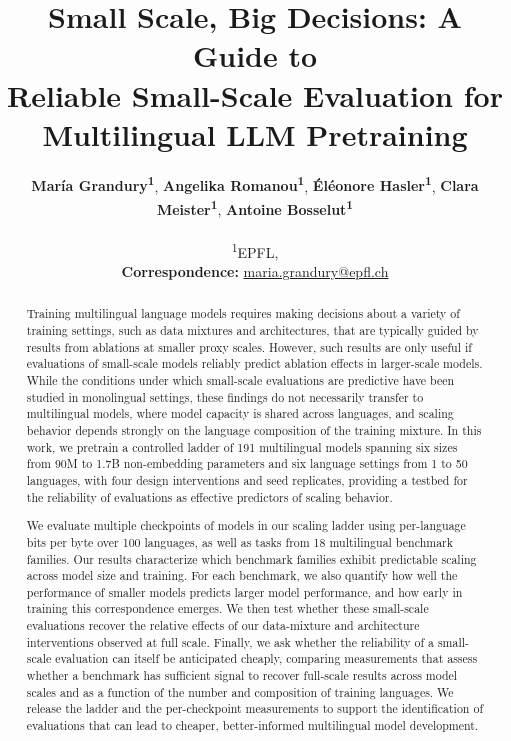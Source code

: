 \documentclass[11pt]{article}
\title{Small Scale, Big Decisions: A Guide to \\ Reliable Small-Scale Evaluation for Multilingual LLM Pretraining}
\author{
  \textbf{María Grandury\textsuperscript{1}},
  \textbf{Angelika Romanou\textsuperscript{1}},
  \textbf{Éléonore Hasler\textsuperscript{1}},
  \textbf{Clara Meister\textsuperscript{1}},
  \textbf{Antoine Bosselut\textsuperscript{1}}
\\
\\
  \textsuperscript{1}EPFL,
\\
  \small{
    \textbf{Correspondence:} \href{mailto:email@domain}{maria.grandury@epfl.ch}
  }
}
\newcommand{\nbenchmarks}{18 }
\newcommand{\nmodels}{191 }
\begin{document}
\maketitle
\begin{abstract}
Training multilingual language models requires making decisions about a variety of training settings, such as data mixtures and architectures, that are typically guided by results from ablations at smaller proxy scales. However, such results are only useful if evaluations of small-scale models reliably predict ablation effects in larger-scale models. 
While the conditions under which small-scale evaluations are predictive have been studied in monolingual settings, these findings do not necessarily transfer to multilingual models, where model capacity is shared across languages, and scaling behavior depends strongly on the language composition of the training mixture. In this work, we pretrain a controlled ladder of \nmodels multilingual models spanning six sizes from 90M to 1.7B non-embedding parameters and six language settings from 1 to 50 languages, with four design interventions and seed replicates, providing a testbed for the reliability of evaluations as effective predictors of scaling behavior. 

We evaluate multiple checkpoints of models in our scaling ladder using per-language bits per byte over 100 languages, as well as tasks from \nbenchmarks multilingual benchmark families. Our results characterize which benchmark families exhibit predictable scaling across model size and training. %
For each benchmark, we also quantify how well the performance of smaller models predicts larger model performance, and how early in training this correspondence emerges. We then test whether these small-scale evaluations recover the relative effects of our data-mixture and architecture interventions observed at full scale. Finally, we ask whether the reliability of a small-scale evaluation can itself be anticipated cheaply, comparing measurements that assess whether a benchmark has sufficient signal to recover full-scale results across model scales and as a function of the number and composition of training languages. We release the ladder and the per-checkpoint measurements to support the identification of evaluations that can lead to cheaper, better-informed multilingual model development.


\end{abstract}
\end{document}
